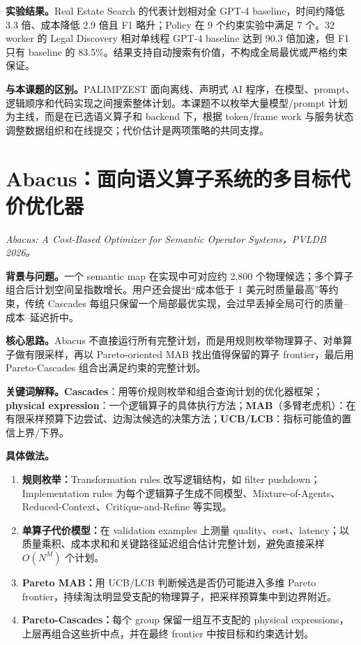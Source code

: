 \documentclass[10pt,a4paper]{ctexart}
\let\digestoriginalsection\section
\renewcommand{\section}{\Needspace{7\baselineskip}\digestoriginalsection}
\newcommand{\paperinfo}[1]{\textit{#1}\par}
\newcommand{\field}[1]{\par\noindent\textbf{#1。}\hspace{0.25em}}
\begin{document}
\field{实验结果}Real Estate Search 的代表计划相对全 GPT-4 baseline，时间约降低 3.3 倍、成本降低 2.9 倍且 F1 略升；Policy 在 9 个约束实验中满足 7 个。32 worker 的 Legal Discovery 相对单线程 GPT-4 baseline 达到 90.3 倍加速，但 F1 只有 baseline 的 83.5\%。结果支持自动搜索有价值，不构成全局最优或严格约束保证。

\field{与本课题的区别}PALIMPZEST 面向离线、声明式 AI 程序，在模型、prompt、逻辑顺序和代码实现之间搜索整体计划。本课题不以枚举大量模型/prompt 计划为主线，而是在已选语义算子和 backend 下，根据 token/frame work 与服务状态调整数据组织和在线提交；代价估计是两项策略的共同支撑。

\section{Abacus：面向语义算子系统的多目标代价优化器}
\paperinfo{Abacus: A Cost-Based Optimizer for Semantic Operator Systems，PVLDB 2026。}

\field{背景与问题}一个 semantic map 在实现中可对应约 2,800 个物理候选；多个算子组合后计划空间呈指数增长。用户还会提出“成本低于 1 美元时质量最高”等约束，传统 Cascades 每组只保留一个局部最优实现，会过早丢掉全局可行的质量--成本--延迟折中。

\field{核心思路}Abacus 不直接运行所有完整计划，而是用规则枚举物理算子、对单算子做有限采样，再以 Pareto-oriented MAB 找出值得保留的算子 frontier，最后用 Pareto-Cascades 组合出满足约束的完整计划。

\field{关键词解释}\textbf{Cascades}：用等价规则枚举和组合查询计划的优化器框架；\textbf{physical expression}：一个逻辑算子的具体执行方法；\textbf{MAB}（多臂老虎机）：在有限采样预算下边尝试、边淘汰候选的决策方法；\textbf{UCB/LCB}：指标可能值的置信上界/下界。

\field{具体做法}
\begin{enumerate}
  \item \textbf{规则枚举：}Transformation rules 改写逻辑结构，如 filter pushdown；Implementation rules 为每个逻辑算子生成不同模型、Mixture-of-Agents、Reduced-Context、Critique-and-Refine 等实现。
  \item \textbf{单算子代价模型：}在 validation examples 上测量 quality、cost、latency；以质量乘积、成本求和和关键路径延迟组合估计完整计划，避免直接采样 $O(N^M)$ 个计划。
  \item \textbf{Pareto MAB：}用 UCB/LCB 判断候选是否仍可能进入多维 Pareto frontier，持续淘汰明显受支配的物理算子，把采样预算集中到边界附近。
  \item \textbf{Pareto-Cascades：}每个 group 保留一组互不支配的 physical expressions，上层再组合这些折中点，并在最终 frontier 中按目标和约束选计划。
\end{enumerate}
\end{document}

